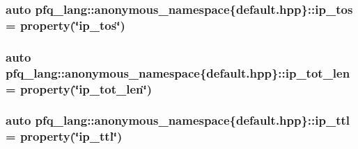 \hypertarget{namespacepfq__lang_1_1anonymous__namespace_02default_8hpp_03_afc29e9877341008196788bba2bde3e04}{
\subsubsection[{ip\+\_\+tos}]{\setlength{\rightskip}{0pt plus 5cm}auto pfq\+\_\+lang\+::anonymous\+\_\+namespace\{default.\+hpp\}\+::ip\+\_\+tos = {\bf property}(\char`\"{}ip\+\_\+tos\char`\"{})}}\label{namespacepfq__lang_1_1anonymous__namespace_02default_8hpp_03_afc29e9877341008196788bba2bde3e04}
\hypertarget{namespacepfq__lang_1_1anonymous__namespace_02default_8hpp_03_a172d424ed5943dda09a80d7c63be9490}{
\subsubsection[{ip\+\_\+tot\+\_\+len}]{\setlength{\rightskip}{0pt plus 5cm}auto pfq\+\_\+lang\+::anonymous\+\_\+namespace\{default.\+hpp\}\+::ip\+\_\+tot\+\_\+len = {\bf property}(\char`\"{}ip\+\_\+tot\+\_\+len\char`\"{})}}\label{namespacepfq__lang_1_1anonymous__namespace_02default_8hpp_03_a172d424ed5943dda09a80d7c63be9490}
\hypertarget{namespacepfq__lang_1_1anonymous__namespace_02default_8hpp_03_a3fb042ff6cf76a1f01b4e97e35b30507}{
\subsubsection[{ip\+\_\+ttl}]{\setlength{\rightskip}{0pt plus 5cm}auto pfq\+\_\+lang\+::anonymous\+\_\+namespace\{default.\+hpp\}\+::ip\+\_\+ttl = {\bf property}(\char`\"{}ip\+\_\+ttl\char`\"{})}}\label{namespacepfq__lang_1_1anonymous__namespace_02default_8hpp_03_a3fb042ff6cf76a1f01b4e97e35b30507}
